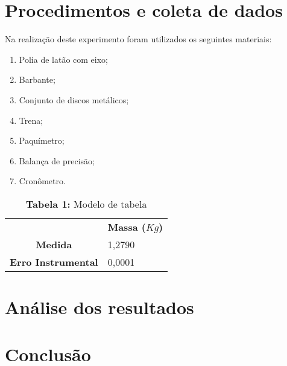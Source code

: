 \documentclass{article}
\begin{document}
\section{Procedimentos e coleta de dados}

Na realização deste experimento foram utilizados os seguintes materiais: 
\begin{enumerate} 
	\item Polia de latão com eixo;
	\item Barbante;
	\item Conjunto de discos metálicos;
	\item Trena;
	\item Paquímetro;
	\item Balança de precisão;
	\item Cronômetro.
 \end {enumerate} 

\begin{table}[!ht]
	\begin{center}
		\caption*{\textbf{Tabela 1:} Modelo de tabela}
		\begin{tabular}{| l | l |}
			\cline{2-2} \multicolumn{0}{c|}{ } & \multicolumn{1}{c|}{\textbf{Massa ($Kg$)}} \\  \cline{1-2}
			\multicolumn{0}{|c|}{\textbf{Medida}} & 1,2790\\ \hline
			\multicolumn{0}{|c|}{\textbf{Erro Instrumental}} & 0,0001\\ \hline
		\end{tabular}
	\end{center}
\end{table}

\section{Análise dos resultados}

\section{Conclusão}
\end{document}
